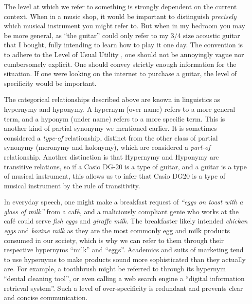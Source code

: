 The level at which we refer to something is strongly dependent on the current context. When in a music shop, it would be important to distinguish \textit{precisely} which musical instrument you might refer to. But when in my bedroom you may be more general, as ``the guitar'' could only refer to my 3/4 size acoustic guitar that I bought, fully intending to learn how to play it one day. The convention is to adhere to the Level of Usual Utility \cite{brown1958shall}, one should not be annoyingly vague nor cumbersomely explicit. One should convey strictly enough information for the situation. If one were looking on the internet to purchase a guitar, the level of specificity would be important.  




The categorical relationships described above are known in linguistics as hypernymy and hyponymy. A hypernym (over name) refers to a more general term, and a hyponym (under name) refers to a more specific term. This is another kind of partial synonymy we mentioned earlier. It is sometimes considered a \textit{type-of} relationship, distinct from the other class of partial synonymy (meronymy and holonymy), which are considered a \textit{part-of} relationship. Another distinction is that Hypernymy and Hyponymy are transitive relations, so if a Casio DG-20 is a type of guitar, and a guitar is a type of musical instrument, this allows us to infer that Casio DG20 is a type of musical instrument by the rule of transitivity.

In everyday speech, one might make a breakfast request of \textit{``eggs on toast with a glass of milk''} from a caf{\'e}, and a maliciously compliant genie who works at the caf{\'e} could serve \textit{fish eggs} and \textit{giraffe milk}. The breakfaster likely intended \textit{chicken eggs} and \textit{bovine milk} as they are the most commonly egg and milk products consumed in our society, which is why we can refer to them through their respective hypernyms ``milk'' and ``eggs''. Academics and suits of marketing tend to use hypernyms to make products sound more sophisticated than they actually are. For example, a toothbrush might be referred to through its hypernym ``dental cleaning tool'', or even calling a web search engine a ``digital information retrieval system''. Such a level of over-specificity is redundant and prevents clear and concise communication.